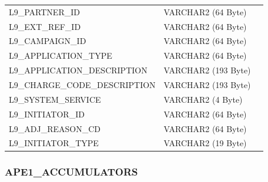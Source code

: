 \documentclass[12pt,twoside]{article}
\begin{document}
\begin{longtable}{lll}
 L9\_PARTNER\_ID                         &  VARCHAR2 (64 Byte)   &                            \\
 L9\_EXT\_REF\_ID                        &  VARCHAR2 (64 Byte)   &                            \\
 L9\_CAMPAIGN\_ID                        &  VARCHAR2 (64 Byte)   &                            \\
 L9\_APPLICATION\_TYPE                   &  VARCHAR2 (64 Byte)   &                            \\
 L9\_APPLICATION\_DESCRIPTION            &  VARCHAR2 (193 Byte)  &                            \\
 L9\_CHARGE\_CODE\_DESCRIPTION           &  VARCHAR2 (193 Byte)  &                            \\
 L9\_SYSTEM\_SERVICE                     &  VARCHAR2 (4 Byte)    &                            \\
 L9\_INITIATOR\_ID                       &  VARCHAR2 (64 Byte)   &                            \\
 L9\_ADJ\_REASON\_CD                     &  VARCHAR2 (64 Byte)   &                            \\
 L9\_INITIATOR\_TYPE                     &  VARCHAR2 (19 Byte)   &                            \\
\hline
\end{longtable}

\normalsize
\subsubsection{APE1\_ACCUMULATORS}
\label{sec-8-3-4}
\end{document}
